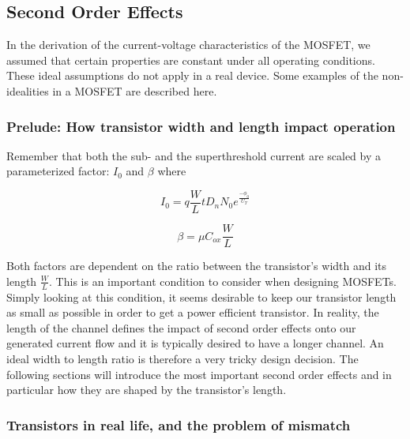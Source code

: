 \subsection{Second Order Effects} \label{subsection:second_order_effects}

In the derivation of the current-voltage characteristics of the MOSFET, we
assumed that certain properties are constant under all operating conditions. These ideal assumptions do not apply in a real device. Some examples of the non-idealities in a MOSFET are described here.  

\subsubsection{Prelude: How transistor width and length impact operation}

Remember that both the sub- and the superthreshold current are scaled by a parameterized factor: $I_0$ and $\beta$ where

\begin{equation}
    I_0 = q \frac{W}{L} t D_n N_0 e^{\frac{-\phi_0}{U_T}}
\end{equation}

\begin{equation}
    \beta = \mu C_{ox} \frac{W}{L}
\end{equation}

Both factors are dependent on the ratio between the transistor's width and its length $\frac{W}{L}$. This is an important condition to consider when designing MOSFETs. Simply looking at this condition, it seems desirable to keep our transistor length as small as possible in order to get a power efficient transistor. In reality, the length of the channel defines the impact of second order effects onto our generated current flow and it is typically desired to have a longer channel. An ideal width to length ratio is therefore a very tricky design decision. The following sections will introduce the most important second order effects and in particular how they are shaped by the transistor's length.

\subsubsection{Transistors in real life, and the problem of mismatch}\label{sec:device_mismatch}

